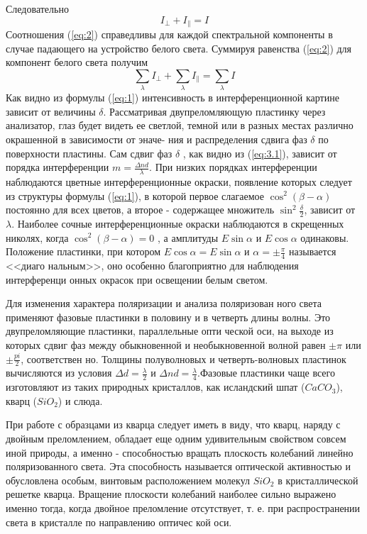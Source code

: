 Следовательно
\begin{equation}
\label{eq:2}
I_{\bot}+I_{\|}=I	
\end{equation}
Соотношения (\ref{eq:2}) справедливы для каждой спектральной компоненты в случае падающего на устройство белого света. Суммируя равенства (\ref{eq:2})
для компонент белого света получим
\begin{equation}
	\sum_{\lambda} I_{\bot}+\sum_{\lambda} I_{\|}=\sum_{\lambda} I
\end{equation}
Как видно из формулы (\ref{eq:1}) интенсивность в интерференционной
картине зависит от величины $\delta$. Рассматривая двупреломляющую
пластинку через анализатор, глаз будет видеть ее светлой, темной
или в разных местах различно окрашенной в зависимости от эначе-
ния и распределения сдвига фаз $\delta$ по поверхности пластины.
Сам сдвиг фаз $\delta$ , как видно из (\ref{eq:3.1}), зависит от порядка интерференции
 $m=\frac{\Delta nd}{\lambda}$. При низких порядках интерферен­ции наблюдаются цветные интерференционные окраски, появление ко­торых следует из структуры формулы (\ref{eq:1}), в которой первое слага­емое $\cos^2(\beta-\alpha)$ постоянно для всех цветов, а второе -
содержащее множитель $\sin^2\frac{\delta}{2}$, зависит от $\lambda$. Наиболее сочные интерференционные окраски наблюдаются в скрещенных
николях, когда $\cos^2(\beta-\alpha)=0$ , а амплитуды $E\sin\alpha$
и $E\cos\alpha$ одинаковы. Положение пластинки, при котором
$E\cos\alpha=E\sin\alpha$ и $\alpha=\pm\frac{\pi}{4}$ называется <<диаго­
нальным>>, оно особенно благоприятно для наблюдения интерференци­
онных окрасок при освещении белым светом.

Для изменения характера поляризации и анализа поляризован­
ного света применяют фазовые пластинки в половину и в четверть
длины волны. Это двупреломляющие пластинки, параллельные опти­
ческой оси, на выходе из которых сдвиг фаз между обыкновенной и
необыкновенной волной равен $\pm\pi$ или $\pm\frac{pi}{2}$, соответствен­
но. Толщины полуволновых и четверть-волновых пластинок вычисляются из условия $\Delta d=\frac{\lambda}{2}$ и $\Delta nd=\frac{\lambda}{4}$.Фазовые
пластинки чаще всего изготовляют из таких природных кристаллов,
как исландский шпат ($CaCO_3$), кварц ($SiO_2$) и слюда.

При работе с образцами из кварца следует иметь в виду, что
кварц, наряду с двойным преломлением, обладает еще одним удивительным свойством совсем иной природы, а именно - способностью
вращать плоскость колебаний линейно поляризованного света. Эта
способность называется оптической активностью и обусловлена особым, винтовым расположением молекул $SiO_2$ в кристаллической решетке кварца. Вращение плоскости колебаний наиболее сильно
выражено именно тогда, когда двойное преломление отсутствует, т.
е. при распространении света в кристалле по направлению оптичес­
кой оси.

